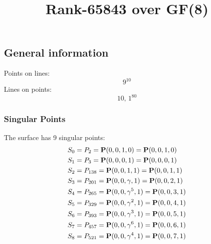 \documentclass{article}
\newcommand\setTBstruts{\def\T{\rule{0pt}{2.6ex}}%
\def\B{\rule[-1.2ex]{0pt}{0pt}}}
\newcommand{\bP}{{\bf P}}
\begin{document}
 
\setTBstruts



{\allowdisplaybreaks%






\title{Rank-65843 over GF(8)}
\author{}%
\maketitle%
%
{}



\subsection*{General information}
Points on lines:
$$
9^{10}$$
Lines on points:
$$
10,\,1^{80}$$
\subsubsection*{Singular Points}
The surface has 9 singular points:\\
\begin{align*}
S_{0} &= P_{2}=\bP(0, 0, 1, 0) = \bP(0, 0, 1, 0)\\
S_{1} &= P_{3}=\bP(0, 0, 0, 1) = \bP(0, 0, 0, 1)\\
S_{2} &= P_{138}=\bP(0, 0, 1, 1) = \bP(0, 0, 1, 1)\\
S_{3} &= P_{201}=\bP(0, 0, \gamma , 1) = \bP(0, 0, 2, 1)\\
S_{4} &= P_{265}=\bP(0, 0, \gamma^{5}, 1) = \bP(0, 0, 3, 1)\\
S_{5} &= P_{329}=\bP(0, 0, \gamma^{2}, 1) = \bP(0, 0, 4, 1)\\
S_{6} &= P_{393}=\bP(0, 0, \gamma^{3}, 1) = \bP(0, 0, 5, 1)\\
S_{7} &= P_{457}=\bP(0, 0, \gamma^{6}, 1) = \bP(0, 0, 6, 1)\\
S_{8} &= P_{521}=\bP(0, 0, \gamma^{4}, 1) = \bP(0, 0, 7, 1)\\
\end{align*}
}
\end{document}
